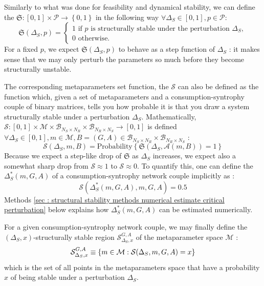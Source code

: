 \documentclass[12pt, titlepage]{report}
\begin{document}
Similarly to what was done for feasibility and dynamical stability, we can define the  $\mathfrak{S} : [0,1] \times \mathcal{P} \rightarrow \left\{0,1\right\}$ in the following way $\forall \Delta_S \in [0,1], p \in \mathcal{P}$:
\begin{equation}
\mathfrak{S}(\Delta_S, p)=
\begin{cases}
1 \text{ if }p \text{ is structurally stable under the perturbation }\Delta_S, \\
0 \text{ otherwise.}
\end{cases}
\end{equation}
For a fixed $p$, we expect $\mathfrak{S}(\Delta_S, p)$ to behave as a step function of $\Delta_S$ : it makes sense that we may only perturb the parameters so much before they become structurally unstable.

The corresponding metaparameters set function, the  $\mathcal{S}$
can also be defined as the function which, given a set of metaparameters and a consumption-syntrophy couple of binary matrices, tells you how probable it is that you draw a system structurally stable under a perturbation $\Delta_S$. Mathematically, $\mathcal{S} : [0,1] \times \mathcal{M} \times \mathcal{B}_{N_S \times N_R} \times \mathcal{B}_{N_R \times N_S} \rightarrow [0,1]$ is defined $\forall \Delta_S \in [0,1], m \in \mathcal{M}, B=(G,A) \in \mathcal{B}_{N_S \times N_R} \times \mathcal{B}_{N_R \times N_S}$ :
\begin{equation}
\boxed{
\mathcal{S}(\Delta_S, m, B)= \text{Probability}\left\{\mathfrak{S}(\Delta_S, \mathcal{A}(m, B))=1\right\}
}
\end{equation}
Because we expect a step-like drop of $\mathfrak{S}$ as $\Delta_S$ increases, we expect also a somewhat sharp drop from $\mathcal{S} \approx 1$ to $\mathcal{S} \approx 0$. To quantify this, one can define the  $\Delta_S^*(m,G,A)$ of a consumption-syntrophy network couple implicitly as :
\begin{equation}
\mathcal{S}(\Delta_S^*(m, G, A), m, G,A)=0.5
\end{equation}
Methods \ref{sec : structural stability methods numerical estimate critical perturbation} below explains how $\Delta_S^*(m, G,A)$ can be estimated numerically.

For a given consumption-syntrophy network couple, we may finally define the $(\Delta_S,x)$-structurally stable region $\mathcal{S}^{G,A}_{\Delta_S, x}$ of the metaparameter space $\mathcal{M}$ :
\begin{equation}
\mathcal{S}^{G,A}_{\Delta_S, x} \equiv \left\{ m \in \mathcal{M} : \mathcal{S}(\Delta_S, m, G, A)=x \right\}
\end{equation}
which is the set of all points in the metaparameters space that have a probability $x$ of being stable under a perturbation $\Delta_S$.
\end{document}
